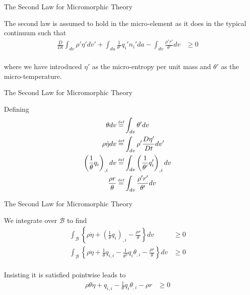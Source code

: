 \documentclass[11pt]{beamer}
\newcommand\defeq{\mathrel{\stackrel{\makebox[0pt]{\mbox{\normalfont\tiny def}}}{=}}}
\begin{document}
\begin{frame}{The Second Law for Micromorphic Theory}

The second law is assumed to hold in the micro-element as it does in the typical continuum such that
\begin{align*}
\frac{D}{Dt}\int_{dv} \rho' \eta' dv' + \int_{da} \frac{1}{\theta'} q_{i}' n_i' da - \int_{dv} \frac{\rho' r'}{\theta'} dv &\geq 0\\ 
\end{align*}

where we have introduced $\eta'$ as the micro-entropy per unit mass and $\theta'$ as the micro-temperature.

\end{frame}

\begin{frame}{The Second Law for Micromorphic Theory}

Defining
\begin{align*}
\theta dv &\defeq \int_{dv} \theta' dv\\
\rho \dot{\eta} dv &\defeq \int_{dv} \rho' \frac{D \eta'}{Dt} dv'\\
\left(\frac{1}{\theta} q_i\right)_{,i} dv &\defeq \int_{dv} \left(\frac{1}{\theta'} q_i'\right)_{,i} dv\\
\frac{\rho r}{\theta} &\defeq \int_{dv} \frac{\rho' r'}{\theta'} dv\\
\end{align*}

\end{frame}

\begin{frame}{The Second Law for Micromorphic Theory}

We integrate over $\mathcal{B}$ to find
\begin{align*}
\int_{\mathcal{B}} \left\{\rho \dot{\eta} + \left(\frac{1}{\theta} q_i\right)_{,i} - \frac{\rho r}{\theta}\right\}dv &\geq 0\\
\int_{\mathcal{B}} \left\{\rho \dot{\eta} + \frac{1}{\theta} q_{i,i} - \frac{1}{\theta^2} q_i \theta_{,i} - \frac{\rho r}{\theta}\right\}dv &\geq 0\\
\end{align*}

Insisting it is satisfied pointwise leads to
\begin{align*}
\rho \theta \dot{\eta} + q_{i,i} - \frac{1}{\theta} q_i \theta_{,i} - \rho r &\geq 0\\
\end{align*}

\end{frame}
\end{document}
